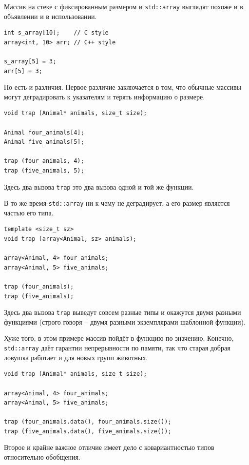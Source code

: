 \documentclass[a4paper,12pt,oneside]{book}
\begin{document}
Массив на стеке с фиксированным размером и \lstinline!std::array! выглядят похоже и в объявлении и в использовании.

\begin{lstlisting}
int s_array[10];    // C style
array<int, 10> arr; // C++ style

s_array[5] = 3;
arr[5] = 3;
\end{lstlisting}

Но есть и различия. Первое различие заключается в том, что обычные массивы могут деградировать к указателям и терять информацию о размере.

\begin{lstlisting}
void trap (Animal* animals, size_t size);

Animal four_animals[4];
Animal five_animals[5];

trap (four_animals, 4);
trap (five_animals, 5);
\end{lstlisting}

Здесь два вызова \lstinline!trap! это два вызова одной и той же функции.

В то же время \lstinline!std::array! ни к чему не деградирует, а его размер является частью его типа.

\begin{lstlisting}
template <size_t sz> 
void trap (array<Animal, sz> animals);

array<Animal, 4> four_animals;
array<Animal, 5> five_animals;

trap (four_animals);
trap (five_animals);
\end{lstlisting}

Здесь два вызова \lstinline!trap! выведут совсем разные типы и окажутся двумя разными функциями (строго говоря -- двумя разными экземплярами шаблонной функции).

Хуже того, в этом примере массив пойдёт в функцию по значению. Конечно, \lstinline!std::array! даёт гарантии непрерывности по памяти, так что старая добрая ловушка работает и для новых групп животных.

\begin{lstlisting}
void trap (Animal* animals, size_t size);

array<Animal, 4> four_animals;
array<Animal, 5> five_animals;

trap (four_animals.data(), four_animals.size());
trap (five_animals.data(), five_animals.size());
\end{lstlisting}

Второе и крайне важное отличие имеет дело с ковариантностью типов относительно обобщения.
\end{document}
